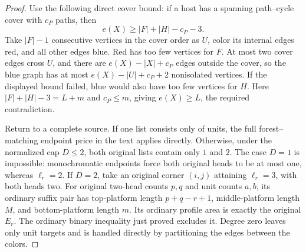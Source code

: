 \documentclass[11pt,a4paper]{article}
\theoremstyle{definition}
\begin{document}
\begin{proof}
Use the following direct cover bound: if a host has a spanning path--cycle cover with $c_P$ paths, then
\[
 e(X)\ge |F|+|H|-c_P-3.
\]
Take $|F|-1$ consecutive vertices in the cover order as $U$, color its internal edges red, and all other edges blue. Red has too few vertices for $F$. At most two cover edges cross $U$, and there are $e(X)-|X|+c_P$ edges outside the cover, so the blue graph has at most $e(X)-|U|+c_P+2$ nonisolated vertices. If the displayed bound failed, blue would also have too few vertices for $H$. Here $|F|+|H|-3=L+m$ and $c_P\le m$, giving $e(X)\ge L$, the required contradiction.

Return to a complete source. If one list consists only of units, the full forest--matching endpoint price in the text applies directly. Otherwise, under the normalized cap $D\le2$, both original lists contain only $1$ and $2$. The case $D=1$ is impossible: monochromatic endpoints force both original heads to be at most one, whereas $\ell_r=2$. If $D=2$, take an original corner $(i,j)$ attaining $\ell_r=3$, with both heads two. For original two-head counts $p,q$ and unit counts $a,b$, its ordinary suffix pair has top-platform length $p+q-r+1$, middle-platform length $M$, and bottom-platform length $m$. Its ordinary profile area is exactly the original $E_r$. The ordinary binary inequality just proved excludes it. Degree zero leaves only unit targets and is handled directly by partitioning the edges between the colors.
\end{proof}
\end{document}
